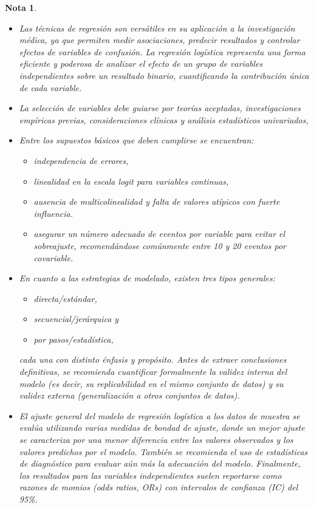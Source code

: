\documentclass[12pt]{article}
\newtheorem{Note}{Nota}%
\begin{document}
\begin{Note}
\begin{itemize}

\item[$\diamond$] Las técnicas de regresión son versátiles en su aplicación a la investigación médica, ya que permiten medir asociaciones, predecir resultados y controlar efectos de variables de confusión. La regresión logística representa una forma eficiente y poderosa de analizar el efecto de un grupo de variables independientes sobre un resultado binario, cuantificando la contribución única de cada variable. 

\item[$\diamond$] La selección de variables debe guiarse por teorías aceptadas, investigaciones empíricas previas, consideraciones clínicas y análisis estadísticos univariados,

\item[$\diamond$] Entre los supuestos básicos que deben cumplirse se encuentran: 
\begin{itemize}
\item independencia de errores, 
\item linealidad en la escala logit para variables continuas, 
\item ausencia de multicolinealidad y falta de valores atípicos con fuerte influencia. 
\item asegurar un número adecuado de eventos por variable para evitar el sobreajuste, recomendándose comúnmente entre 10 y 20 eventos por covariable.
\end{itemize}

\item[$\diamond$] En cuanto a las estrategias de modelado, existen tres tipos generales:
\begin{itemize}
\item \textit{ directa/estándar}, 
\item \textit{secuencial/jerárquica} y 
\item \textit{por pasos/estadística}, 
\end{itemize}
cada una con distinto énfasis y propósito. Antes de extraer conclusiones definitivas, se recomienda cuantificar formalmente la validez interna del modelo (es decir, su replicabilidad en el mismo conjunto de datos) y su validez externa (generalización a otros conjuntos de datos).

\item[$\diamond$] El ajuste general del modelo de regresi\'on log\'istica a los datos de muestra se eval\'ua utilizando varias \textit{medidas de bondad de ajuste}, donde un mejor ajuste se caracteriza por una menor diferencia entre los valores observados y los valores predichos por el modelo. Tambi\'en se recomienda el uso de \textit{estad\'isticas de diagn\'ostico} para evaluar a\'un m\'as la adecuaci\'on del modelo. Finalmente, los resultados para las variables independientes suelen reportarse como \textit{razones de momios} (odds ratios, ORs) con \textit{intervalos de confianza} (IC) del 95\%.


\end{itemize}
\end{Note}
\end{document}
